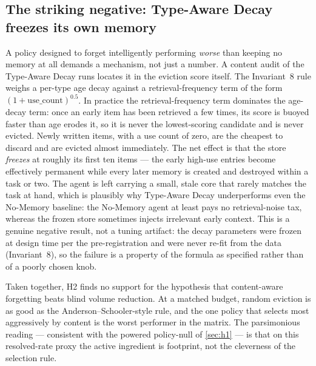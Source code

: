 \subsection{The striking negative: Type-Aware Decay freezes its own memory}
\label{sec:h2-tad-mechanism}

A policy designed to forget intelligently performing \emph{worse} than keeping no memory at
all demands a mechanism, not just a number. A content audit of the Type-Aware Decay runs
locates it in the eviction score itself. The Invariant~8 rule weighs a per-type age decay
against a retrieval-frequency term of the form $(1+\text{use\_count})^{0.5}$. In practice
the retrieval-frequency term dominates the age-decay term: once an early item has been
retrieved a few times, its score is buoyed faster than age erodes it, so it is never the
lowest-scoring candidate and is never evicted. Newly written items, with a use count of
zero, are the cheapest to discard and are evicted almost immediately. The net effect is
that the store \emph{freezes} at roughly its first ten items --- the early high-use entries
become effectively permanent while every later memory is created and destroyed within a
task or two. The agent is left carrying a small, stale core that rarely matches the task at
hand, which is plausibly why Type-Aware Decay underperforms even the No-Memory baseline:
the No-Memory agent at least pays no retrieval-noise tax, whereas the frozen store
sometimes injects irrelevant early context. This is a genuine negative result, not a tuning
artifact: the decay parameters were frozen at design time per the pre-registration and were
never re-fit from the data (Invariant~8), so the failure is a property of the formula as
specified rather than of a poorly chosen knob.

Taken together, H2 finds no support for the hypothesis that content-aware forgetting beats
blind volume reduction. At a matched budget, random eviction is as good as the
Anderson--Schooler-style rule, and the one policy that selects most aggressively by content
is the worst performer in the matrix. The parsimonious reading --- consistent with the
powered policy-null of \autoref{sec:h1} --- is that on this resolved-rate proxy the active
ingredient is footprint, not the cleverness of the selection rule.
